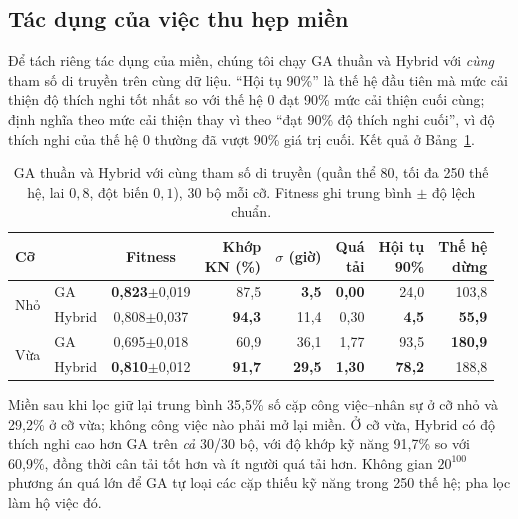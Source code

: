 \documentclass{IEEEtran}
\begin{document}
\subsection{Tác dụng của việc thu hẹp miền}
\label{sec:domain}

Để tách riêng tác dụng của miền, chúng tôi chạy GA thuần và Hybrid với \emph{cùng} tham số di truyền trên cùng dữ liệu. ``Hội tụ 90\%'' là thế hệ đầu tiên mà mức cải thiện độ thích nghi tốt nhất so với thế hệ 0 đạt 90\% mức cải thiện cuối cùng; định nghĩa theo mức cải thiện thay vì theo ``đạt 90\% độ thích nghi cuối'', vì độ thích nghi của thế hệ 0 thường đã vượt 90\% giá trị cuối. Kết quả ở Bảng~\ref{tab:domain}.

\begin{table}[t]
\centering
\caption{GA thuần và Hybrid với cùng tham số di truyền (quần thể 80, tối đa 250 thế hệ, lai $0{,}8$, đột biến $0{,}1$), 30 bộ mỗi cỡ. Fitness ghi trung bình $\pm$ độ lệch chuẩn.}
\label{tab:domain}
\footnotesize
\setlength{\tabcolsep}{2.2pt}
\begin{tabular}{llcrrrrr}
\toprule
Cỡ & & Fitness & \shortstack{Khớp\\KN (\%)} & \shortstack{$\sigma$\\(giờ)} & \shortstack{Quá\\tải} & \shortstack{Hội tụ\\90\%} & \shortstack{Thế hệ\\dừng} \\
\midrule
\multirow{2}{*}{Nhỏ} & GA     & \textbf{0,823}$\pm$0,019 & 87,5 & \textbf{3,5} & \textbf{0,00} & 24,0 & 103,8 \\
                     & Hybrid & 0,808$\pm$0,037 & \textbf{94,3} & 11,4 & 0,30 & \textbf{4,5} & \textbf{55,9} \\
\midrule
\multirow{2}{*}{Vừa} & GA     & 0,695$\pm$0,018 & 60,9 & 36,1 & 1,77 & 93,5 & \textbf{180,9} \\
                     & Hybrid & \textbf{0,810}$\pm$0,012 & \textbf{91,7} & \textbf{29,5} & \textbf{1,30} & \textbf{78,2} & 188,8 \\
\bottomrule
\end{tabular}
\end{table}

Miền sau khi lọc giữ lại trung bình 35,5\% số cặp công việc--nhân sự ở cỡ nhỏ và 29,2\% ở cỡ vừa; không công việc nào phải mở lại miền. Ở cỡ vừa, Hybrid có độ thích nghi cao hơn GA trên \emph{cả} 30/30 bộ, với độ khớp kỹ năng 91,7\% so với 60,9\%, đồng thời cân tải tốt hơn và ít người quá tải hơn. Không gian $20^{100}$ phương án quá lớn để GA tự loại các cặp thiếu kỹ năng trong 250 thế hệ; pha lọc làm hộ việc đó.
\end{document}
